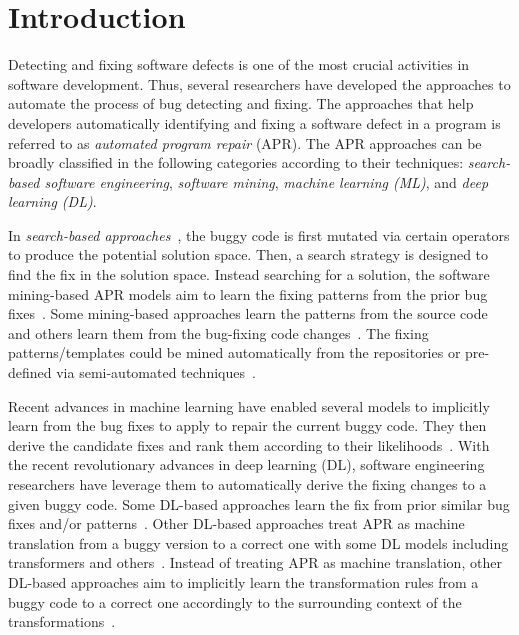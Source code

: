 \section{Introduction}


Detecting and fixing software defects is one of the most crucial
activities in software development. Thus, several researchers have
developed the approaches to automate the process of bug detecting and
fixing. The approaches that help developers automatically identifying
and fixing a software defect in a program is referred to as {\em
  automated program repair} (APR). The APR approaches can be broadly
classified in the following categories according to their techniques:
{\em search-based software engineering}, {\em software mining}, {\em
  machine learning (ML)}, and {\em deep learning (DL)}.

In {\em search-based
  approaches}~\cite{LeGoues-icse12,le2011genprog,martinez2016astor,qi2014strength},
the buggy code is first mutated via certain operators to produce the
potential solution space. Then, a search strategy is designed to find
the fix in the solution space. Instead searching for a solution, the
software mining-based APR models aim to learn the fixing patterns from
the prior bug
fixes~\cite{kim2013automatic,le2016history,liu2019avatar,tbar-issta19,nguyen2013semfix,
  icse10,ray-fse12}. Some mining-based approaches learn the patterns
from the source code~\cite{liu2019avatar,tbar-issta19} and others
learn them from the bug-fixing code
changes~\cite{wen2018context,Simfix,koyuncu2018fixminer}.  The fixing
patterns/templates could be mined automatically from the repositories
or pre-defined via semi-automated
techniques~\cite{le2016history,nguyen2013semfix,liu2019avatar,tbar-issta19}.

Recent advances in machine learning have enabled several models to
implicitly learn from the bug fixes to apply to repair the current
buggy code.  They then derive the candidate fixes and rank them
according to their
likelihoods~\cite{long2016automatic,long2017automatic,saha2017elixir}.
With the recent revolutionary advances in deep learning (DL), software
engineering researchers have leverage them to automatically derive the
fixing changes to a given buggy code. Some DL-based approaches learn
the fix from prior similar bug fixes and/or
patterns~\cite{gupta2017deepfix,white2019sorting,white2016deep}.
Other DL-based approaches treat APR as machine translation from a
buggy version to a correct one with some DL models including
transformers and
others~\cite{chakrabortycodit,chen2018sequencer,hata2018learning,tufano2018empirical,see2017get,tufano2019learning}. Instead
of treating APR as machine translation, other DL-based approaches aim
to implicitly learn the transformation rules from a buggy code to a
correct one accordingly to the surrounding context of the
transformations~\cite{icse20}.


